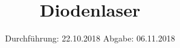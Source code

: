 

\subject{VERSUCH NUMMER 60}
\title{Diodenlaser}
\date{
  Durchführung: 22.10.2018
  \hspace{3em}
  Abgabe: 06.11.2018
}



\thispagestyle{empty}
\maketitle
\thispagestyle{empty}
\tableofcontents
\newpage
\setcounter{page}{1}


% 

% 


\nocite{*}
\printbibliography


